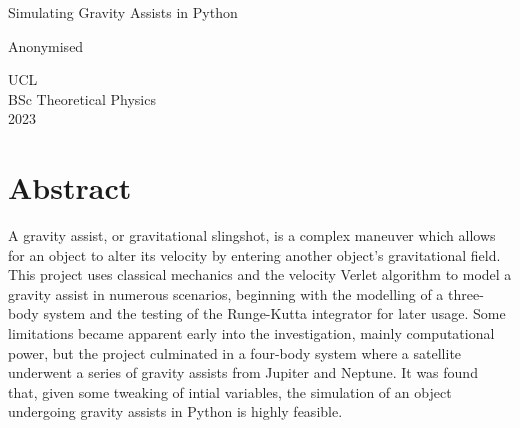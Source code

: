 \documentclass[12pt, english]{report}
\begin{document}
\begin{titlepage}

   \begin{center}
       \vspace*{3cm}
       {Simulating Gravity Assists in Python}
 
       \vspace{4cm}
 
       {Anonymised}\\
       
       \vspace*{10cm}
      
       
      UCL\\
      
      BSc Theoretical Physics\\
      
      2023
      
 
   \end{center}
\end{titlepage}

\setcounter{page}{2}
\noindent 
\chapter*{\huge{\textbf{Abstract}}}
\normalsize{\noindent A gravity assist, or gravitational slingshot, is a complex maneuver which allows for an object to alter its velocity by entering another object's gravitational field. This project uses classical mechanics and the velocity Verlet algorithm to model a gravity assist in numerous scenarios, beginning with the modelling of a three-body system and the testing of the Runge-Kutta integrator for later usage. Some limitations became apparent early into the investigation, mainly computational power, but the project culminated in a four-body system where a satellite underwent a series of gravity assists from Jupiter and Neptune. It was found that, given some tweaking of intial variables, the simulation of an object undergoing gravity assists in Python is highly feasible.}
%


%


\setlength{\cftbeforetoctitleskip}{-22pt}
\setlength{\cftaftertoctitleskip}{-22pt}
\renewcommand{\contentsname}{\huge\textbf{Table of Contents}}
\renewcommand{\cfttoctitlefont}{\chapter*}

\tableofcontents
\end{document}
